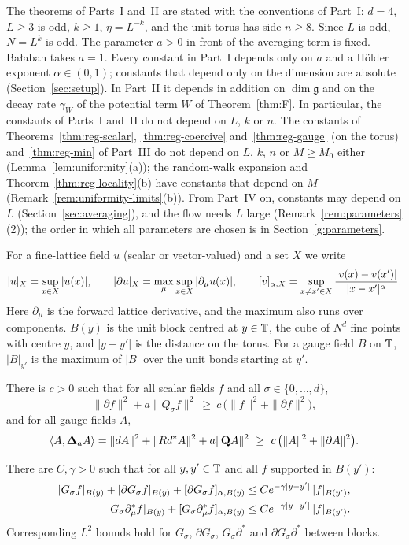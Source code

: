 The theorems of Parts~I and~II are stated with the conventions of Part~I: $d=4$, $L\ge3$ is odd, $k\ge1$, $\eta=L^{-k}$, and the unit torus has side $n\ge8$. Since $L$ is odd, $N=L^k$ is odd. The parameter $a>0$ in front of the averaging term is fixed. Ba\l aban takes $a=1$. Every constant in Part~I depends only on $a$ and a H\"older exponent $\alpha\in(0,1)$; constants that depend only on the dimension are absolute (Section~\ref{sec:setup}). In Part~II it depends in addition on $\dim\mathfrak g$ and on the decay rate $\gamma_W$ of the potential term $W$ of Theorem~\ref{thm:F}. In particular, the constants of Parts~I and~II do not depend on $L$, $k$ or $n$. The constants of Theorems~\ref{thm:reg-scalar}, \ref{thm:reg-coercive} and~\ref{thm:reg-gauge} (on the torus) and~\ref{thm:reg-min} of Part~III do not depend on $L$, $k$, $n$ or $M\ge M_0$ either (Lemma~\ref{lem:uniformity}(a)); the random-walk expansion and Theorem~\ref{thm:reg-locality}(b) have constants that depend on $M$ (Remark~\ref{rem:uniformity-limits}(b)). From Part~IV on, constants may depend on $L$ (Section~\ref{sec:averaging}), and the flow needs $L$ large (Remark~\ref{rem:parameters}(2)); the order in which all parameters are chosen is in Section~\ref{g:parameters}.

For a fine-lattice field $u$ (scalar or vector-valued) and a set $X$ we write
\[
|u|_X=\sup_{x\in X}|u(x)|,\qquad
|\partial u|_X=\max_\mu\sup_{x\in X}|\partial_\mu u(x)|,\qquad
[v]_{\alpha,X}=\sup_{x\ne x'\in X}\frac{|v(x)-v(x')|}{|x-x'|^\alpha}.
\]
Here $\partial_\mu$ is the forward lattice derivative, and the maximum also runs over components. $B(y)$ is the unit block centred at $y\in\mathbb T$, the cube of $N^d$ fine points with centre $y$, and $|y-y'|$ is the distance on the torus. For a gauge field $B$ on $\mathbb T$, $|B|_{y'}$ is the maximum of $|B|$ over the unit bonds starting at $y'$.

\begin{maintheorem}\label{thm:A}
There is $c>0$ such that for all scalar fields $f$ and all $\sigma\in\{0,\dots,d\}$,
\[
\|\partial f\|^2+a\|Q_\sigma f\|^2\ \ge\ c\,\big(\|f\|^2+\|\partial f\|^2\big),
\]
and for all gauge fields $A$,
\[
\langle A,\boldsymbol{\Delta}_a A\rangle=\|dA\|^2+\|Rd^*A\|^2+a\|\mathbf Q A\|^2\ \ge\ c\,\big(\|A\|^2+\|\partial A\|^2\big).
\]
\end{maintheorem}

\begin{maintheorem}\label{thm:B}
There are $C,\gamma>0$ such that for all $y,y'\in\mathbb T$ and all $f$ supported in $B(y')$:
\begin{align*}
|G_\sigma f|_{B(y)}+|\partial G_\sigma f|_{B(y)}+[\partial G_\sigma f]_{\alpha,B(y)}&\le Ce^{-\gamma|y-y'|}\,|f|_{B(y')},\\
|G_\sigma \partial_\mu^* f|_{B(y)}+[G_\sigma\partial^*_\mu f]_{\alpha,B(y)}&\le Ce^{-\gamma|y-y'|}\,|f|_{B(y')}.
\end{align*}
Corresponding $L^2$ bounds hold for $G_\sigma$, $\partial G_\sigma$, $G_\sigma\partial^*$ and $\partial G_\sigma\partial^*$ between blocks.
\end{maintheorem}

